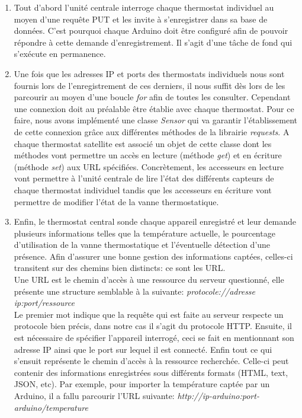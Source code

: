 \documentclass[12pt]{report}
\begin{document}
\begin{enumerate}
\item Tout d'abord l'unité centrale interroge chaque thermostat individuel au moyen d'une requête PUT et les invite à s'enregistrer dans sa base de données. C'est pourquoi chaque Arduino doit être configuré afin de pouvoir répondre à cette demande d'enregistrement. Il s'agit d'une tâche de fond qui s'exécute en permanence.\\
\item Une fois que les adresses IP et ports des thermostats individuels nous sont fournis lors de l'enregistrement de ces derniers, il nous suffit dès lors de les parcourir au moyen d'une boucle \emph{for} afin de toutes les consulter. Cependant une connexion doit au préalable être établie avec chaque thermostat. Pour ce faire, nous avons implémenté une classe \emph{Sensor} qui va garantir l'établissement de cette connexion grâce aux différentes méthodes de la librairie \emph{requests}. %
A chaque thermostat satellite est associé un objet de cette classe dont les méthodes vont permettre un accès en lecture (méthode \emph{get}) et en écriture (méthode \emph{set}) aux URL spécifiées. Concrètement, les accesseurs en lecture vont permettre à l'unité centrale de lire l'état des différents capteurs de chaque thermostat individuel tandis que les accesseurs en écriture vont permettre de modifier l'état de la vanne thermostatique.\\
\item Enfin, le thermostat central sonde chaque appareil enregistré et leur demande plusieurs informations telles que la température actuelle, le pourcentage d'utilisation de la vanne thermostatique et l'éventuelle détection d'une présence. Afin d'assurer une bonne gestion des informations captées, celles-ci transitent sur des chemins bien distincts: ce sont les URL.\\
Une URL est le chemin d'accès à une ressource du serveur questionné, elle présente une structure semblable à la suivante: \emph{protocole://adresse ip:port/ressource}\\
Le premier mot indique que la requête qui est faite au serveur respecte un protocole bien précis, dans notre cas il s'agit du protocole HTTP. Ensuite, il est nécessaire de spécifier l'appareil interrogé, ceci se fait en mentionnant son adresse IP ainsi que le port sur lequel il est connecté. Enfin tout ce qui s'ensuit représente le chemin d'accès à la ressource recherchée. Celle-ci peut contenir des informations enregistrées sous différents formats (HTML, text, JSON, etc). Par exemple, pour importer la température captée par un Arduino, il a fallu parcourir l'URL suivante: \emph{http://ip-arduino:port-arduino/temperature}\\ %

\end{enumerate}
\end{document}
